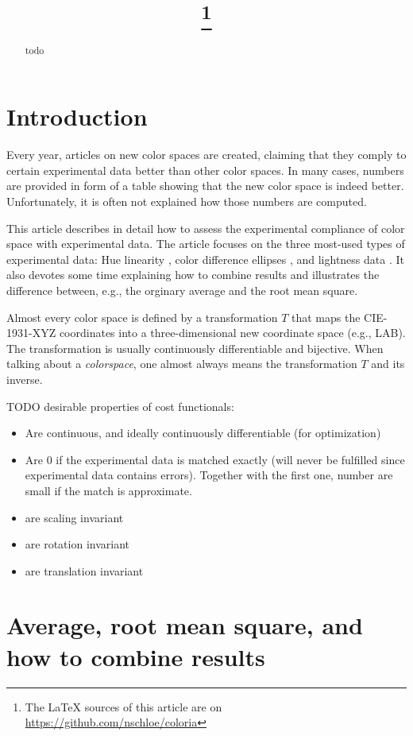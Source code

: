 \documentclass{scrartcl}
\title{\mytitle\footnote{The LaTeX sources of this article are on
\url{https://github.com/nschloe/coloria}}}
\author{\myauthor}
\theoremstyle{named}
\begin{document}
\maketitle
\begin{abstract}
  todo
\end{abstract}

\section{Introduction}

Every year, articles on new color spaces are created, claiming that they comply to
certain experimental data better than other color spaces. In many cases, numbers are
provided in form of a table showing that the new color space is indeed better.
Unfortunately, it is often not explained how those numbers are computed.

This article describes in detail how to assess the experimental compliance of color
space with experimental data. The article focuses on the three most-used types of
experimental data: Hue linearity \cite{ebner,xiao,hung}, color difference ellipses
\cite{macadam1942,luorigg}, and lightness data \cite{fairchildchen}. It also devotes
some time explaining how to combine results and illustrates the difference between,
e.g., the orginary average and the root mean square.

Almost every color space is defined by a transformation $T$ that maps the CIE-1931-XYZ
coordinates into a three-dimensional new coordinate space (e.g., LAB). The
transformation is usually continuously differentiable and bijective. When talking about
a \emph{colorspace}, one almost always means the transformation $T$ and its inverse.


TODO desirable properties of cost functionals:
\begin{itemize}
  \item Are continuous, and ideally continuously differentiable (for optimization)
  \item Are 0 if the experimental data is matched exactly (will never be fulfilled since
    experimental data contains errors). Together with the first one, number are small if
    the match is approximate.
  \item are scaling invariant
  \item are rotation invariant
  \item are translation invariant
\end{itemize}


\section{Average, root mean square, and how to combine results}
\end{document}
